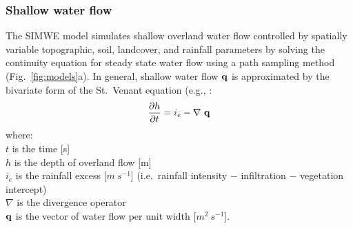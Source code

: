 \documentclass[gmd, manuscript]{copernicus}
\begin{document}


\subsubsection{Shallow water flow}

The SIMWE model simulates shallow overland water flow
controlled by spatially variable topographic, soil, landcover, 
and rainfall parameters
by solving the continuity equation 
for steady state water flow using a path sampling method
(Fig.~\ref{fig:models}a). 
In general, shallow water flow ${\bf q}$ is approximated by
the bivariate form of the St.~Venant equation (e.g., \citep{haan1994}:
\begin{equation}
\label{eq:water}
{\partial h \over \partial t} =
 i_e - \nabla ~ {\bf q}
\end{equation}
{\small
\noindent
where: \\
\noindent
\hspace*{0.5em} $t$ is the time [\unit{s}] \\
\hspace*{0.5em} $h$ is the depth of overland flow [\unit{m}]\\
\hspace*{0.5em} $i_e$ is the rainfall excess [$\unit{m~s^{-1}}$]
(i.e.~rainfall intensity $-$ infiltration $-$ vegetation intercept)\\
\hspace*{0.5em} $\nabla$ is the divergence operator\\
\hspace*{0.5em} ${\bf q}$ is the vector of water flow per unit width [$\unit{m}^2~\unit{s}^{-1}$]. \\
}
\end{document}
